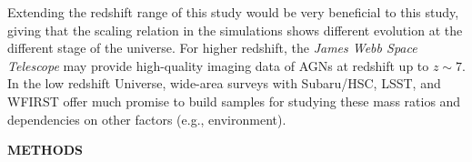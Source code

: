\documentclass{natureprintstyle}
\newcommand{\hst}{{\it HST}}
\newcommand{\mbh}{$\mathcal M_{\rm BH}$}
\newcommand{\lhost}{$L_{\rm host}$}
\newcommand{\mstar}{{$M_*$}}
\begin{document}
Extending the redshift range of this study would be very beneficial to this study, giving that the scaling relation in the simulations shows different evolution at the different stage of the universe. For higher redshift, the {\it James Webb Space Telescope} may provide high-quality imaging data of AGNs at redshift up to $z\sim7$. In the low redshift Universe, wide-area surveys with Subaru/HSC, LSST, and WFIRST offer much promise to build samples for studying these mass ratios and dependencies on other factors (e.g., environment).





\begin{center}
{\bf \Large \uppercase{Methods} }
\end{center}
\end{document}
